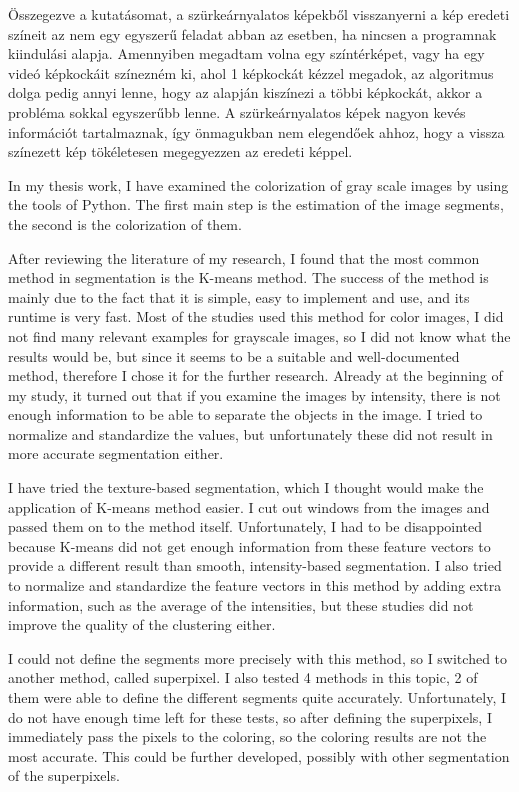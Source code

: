 Összegezve a kutatásomat, a szürkeárnyalatos képekből visszanyerni a kép eredeti színeit az nem egy egyszerű feladat abban az esetben, ha nincsen a programnak kiindulási alapja. Amennyiben megadtam volna egy színtérképet, vagy ha egy videó képkockáit színezném ki, ahol 1 képkockát kézzel megadok, az algoritmus dolga pedig annyi lenne, hogy az alapján kiszínezi a többi képkockát, akkor a probléma sokkal egyszerűbb lenne. A szürkeárnyalatos képek nagyon kevés információt tartalmaznak, így önmagukban nem elegendőek ahhoz, hogy a vissza színezett kép tökéletesen megegyezzen az eredeti képpel.


In my thesis work, I have examined the colorization of gray scale images by using the tools of Python.
The first main step is the estimation of the image segments, the second is the colorization of them.

After reviewing the literature of my research, I found that the most common method in segmentation is the K-means method. The success of the method is mainly due to the fact that it is simple, easy to implement and use, and its runtime is very fast. Most of the studies used this method for color images, I did not find many relevant examples for grayscale images, so I did not know what the results would be, but since it seems to be a suitable and well-documented method, therefore I chose it for the further research. Already at the beginning of my study, it turned out that if you examine the images by intensity, there is not enough information to be able to separate the objects in the image. I tried to normalize and standardize the values, but unfortunately these did not result in more accurate segmentation either.

I have tried the texture-based segmentation, which I thought would make the application of K-means method easier. I cut out windows from the images and passed them on to the method itself. Unfortunately, I had to be disappointed because K-means did not get enough information from these feature vectors to provide a different result than smooth, intensity-based segmentation. I also tried to normalize and standardize the feature vectors in this method by adding extra information, such as the average of the intensities, but these studies did not improve the quality of the clustering either.

I could not define the segments more precisely with this method, so I switched to another method, called superpixel. I also tested 4 methods in this topic, 2 of them were able to define the different segments quite accurately. Unfortunately, I do not have enough time left for these tests, so after defining the superpixels, I immediately pass the pixels to the coloring, so the coloring results are not the most accurate. This could be further developed, possibly with other segmentation of the superpixels.

